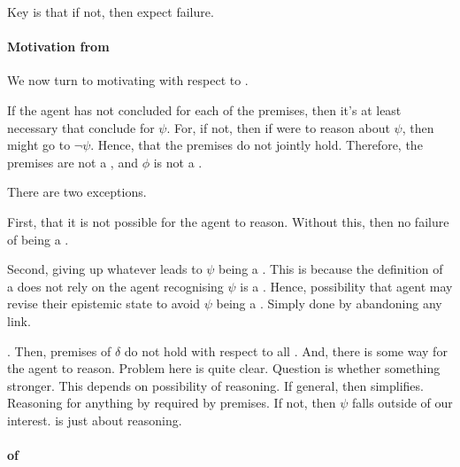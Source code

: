 \begin{note}
  Key is that if not, then expect failure.
\end{note}

\paragraph{Motivation from \support{}}

\begin{note}
  We now turn to motivating \ideaCS{} with respect to .
\end{note}

\begin{note}
  If the agent has not concluded for each of the premises, then it's at least necessary that conclude for \(\psi\).
  For, if not, then if were to reason about \(\psi\), then might go to \(\lnot\psi\).
  Hence, that the premises do not jointly hold.
  Therefore, the premises are not a \sink{}, and \(\phi\) is not a \sink{}.
\end{note}

\begin{note}
  There are two exceptions.

  First, that it is not possible for the agent to reason.
  Without this, then no failure of being a \sink{}.

  Second, giving up whatever leads to \(\psi\) being a \prequ{}.
  This is because the definition of a \prequ{} does not rely on the agent recognising \(\psi\) is a \prequ{}.
  Hence, possibility that agent may revise their epistemic state to avoid \(\psi\) being a \prequ{}.
  Simply done by abandoning any link.
\end{note}

\begin{note}[\prequ{}]
  \prequ{}.
  Then, premises of \(\delta\) do not hold with respect to all .
  And, there is some way for the agent to reason.
  Problem here is quite clear.
  Question is whether something stronger.
  This depends on possibility of reasoning.
  If general, then simplifies.
  Reasoning for anything by required by premises.
  If not, then \(\psi\) falls outside of our interest.
   is just about reasoning.
\end{note}



\paragraph{ of }

